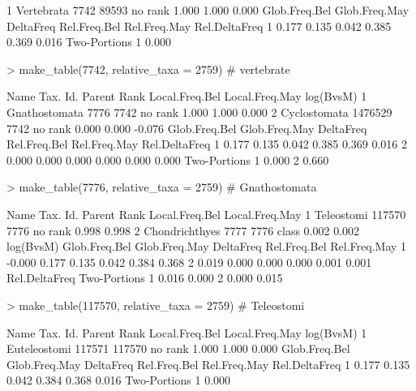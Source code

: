 \documentclass{article}
\begin{document}
\begin{Schunk}
\begin{Soutput}
1 Vertebrata     7742  89593 no rank          1.000          1.000     0.000
  Glob.Freq.Bel Glob.Freq.May DeltaFreq Rel.Freq.Bel Rel.Freq.May Rel.DeltaFreq
1         0.177         0.135     0.042        0.385        0.369         0.016
  Two-Portions
1        0.000
\end{Soutput}
\begin{Sinput}
> make_table(7742, relative_taxa = 2759)  # vertebrate
\end{Sinput}
\begin{Soutput}
           Name Tax. Id. Parent    Rank Local.Freq.Bel Local.Freq.May log(BvsM)
1 Gnathostomata     7776   7742 no rank          1.000          1.000     0.000
2  Cyclostomata  1476529   7742 no rank          0.000          0.000    -0.076
  Glob.Freq.Bel Glob.Freq.May DeltaFreq Rel.Freq.Bel Rel.Freq.May Rel.DeltaFreq
1         0.177         0.135     0.042        0.385        0.369         0.016
2         0.000         0.000     0.000        0.000        0.000         0.000
  Two-Portions
1        0.000
2        0.660
\end{Soutput}
\begin{Sinput}
> make_table(7776, relative_taxa = 2759)  # Gnathostomata
\end{Sinput}
\begin{Soutput}
            Name Tax. Id. Parent    Rank Local.Freq.Bel Local.Freq.May
1     Teleostomi   117570   7776 no rank          0.998          0.998
2 Chondrichthyes     7777   7776   class          0.002          0.002
  log(BvsM) Glob.Freq.Bel Glob.Freq.May DeltaFreq Rel.Freq.Bel Rel.Freq.May
1    -0.000         0.177         0.135     0.042        0.384        0.368
2     0.019         0.000         0.000     0.000        0.001        0.001
  Rel.DeltaFreq Two-Portions
1         0.016        0.000
2         0.000        0.015
\end{Soutput}
\begin{Sinput}
> make_table(117570, relative_taxa = 2759) # Teleostomi
\end{Sinput}
\begin{Soutput}
          Name Tax. Id. Parent    Rank Local.Freq.Bel Local.Freq.May log(BvsM)
1 Euteleostomi   117571 117570 no rank          1.000          1.000     0.000
  Glob.Freq.Bel Glob.Freq.May DeltaFreq Rel.Freq.Bel Rel.Freq.May Rel.DeltaFreq
1         0.177         0.135     0.042        0.384        0.368         0.016
  Two-Portions
1        0.000
\end{Soutput}
\begin{Sinput}

\end{Sinput}
\end{Schunk}
\end{document}
